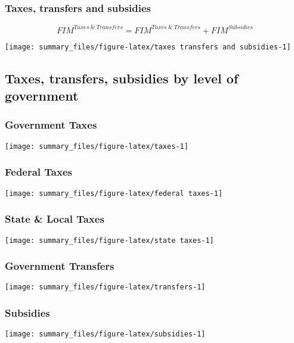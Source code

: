 \documentclass[
]{article}
\begin{document}
\hypertarget{taxes-transfers-and-subsidies}{%
\subsubsection{Taxes, transfers and
subsidies}\label{taxes-transfers-and-subsidies}}

\[FIM^{Taxes\ \& \ Transfers} = FIM^{Taxes\ \&\ Transfers} + FIM^{Subsidies}  \]

\begin{center}\texttt{[image: summary\_files/figure-latex/taxes transfers and subsidies-1]} \end{center}

\hypertarget{taxes-transfers-subsidies-by-level-of-government}{%
\subsection{Taxes, transfers, subsidies by level of
government}\label{taxes-transfers-subsidies-by-level-of-government}}

\hypertarget{government-taxes}{%
\subsubsection{Government Taxes}\label{government-taxes}}

\begin{center}\texttt{[image: summary\_files/figure-latex/taxes-1]} \end{center}

\hypertarget{federal-taxes}{%
\subsubsection{Federal Taxes}\label{federal-taxes}}

\begin{center}\texttt{[image: summary\_files/figure-latex/federal taxes-1]} \end{center}

\hypertarget{state-local-taxes}{%
\subsubsection{State \& Local Taxes}\label{state-local-taxes}}

\begin{center}\texttt{[image: summary\_files/figure-latex/state taxes-1]} \end{center}

\hypertarget{government-transfers}{%
\subsubsection{Government Transfers}\label{government-transfers}}

\begin{center}\texttt{[image: summary\_files/figure-latex/transfers-1]} \end{center}

\hypertarget{subsidies}{%
\subsubsection{Subsidies}\label{subsidies}}

\begin{center}\texttt{[image: summary\_files/figure-latex/subsidies-1]} \end{center}
\end{document}
